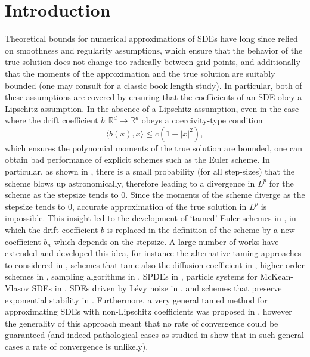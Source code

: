 \documentclass{article}
\begin{document}
\section{Introduction}
Theoretical bounds for numerical approximations of SDEs have long since relied on smoothness and regularity assumptions, which ensure that the behavior of the true solution does not change too radically between grid-points, and additionally that the moments of the approximation and the true solution are suitably bounded (one may consult \cite{kloeden2013numerical} for a classic book length study). In particular, both of these assumptions are covered by ensuring that the coefficients of an SDE obey a Lipschitz assumption. In the absence of a Lipschitz assumption, even in the case where the drift coefficient $b:\mathbb{R}^d\to\mathbb{R}^d$ obeys a coercivity-type condition 
\begin{equation}\label{eq: coercivity}
    \langle b(x),x\rangle\leq c(1+\lvert x\rvert^2),
\end{equation}
which ensures the polynomial moments of the true solution are bounded, one can obtain bad performance of explicit schemes such as the Euler scheme. In particular, as shown in \cite{articlediv, ae1c5b69-79b7-3bf4-87cb-ba6dd72c5ca2}, there is a small probability (for all step-sizes) that the scheme blows up astronomically, therefore leading to a divergence in $L^p$ for the scheme as the stepsize tends to $0$. Since the moments of the scheme diverge as the stepsize tends to $0$, accurate approximation of the true solution in $L^p$ is impossible. This insight led to the development of `tamed' Euler schemes in \cite{da2b46b6-84fa-3eed-be6d-20c143c60df1}, in which the drift coefficient $b$ is replaced in the definition of the scheme by a new coefficient $b_n$ which depends on the stepsize. A large number of works have extended and developed this idea, for instance the alternative taming approaches to \cite{da2b46b6-84fa-3eed-be6d-20c143c60df1} considered in \cite{articletamed, MAO2015370}, schemes that tame also the diffusion coefficient in \cite{articledif}, higher order schemes in \cite{SABANIS201984}, sampling algorithms in \cite{BROSSE20193638, 10.1093/imanum/drad038}, SPDEs in \cite{0329d33d261740b59da99f06a80a9570, Brehier2022}, particle systems for McKean-Vlasov SDEs in \cite{10.1214/21-AAP1760}, SDEs driven by Lévy noise in \cite{doi:10.1137/151004872}, and schemes that preserve exponential stability in \cite{09794cb6-f51d-34af-8144-efe133f5a106}. Furthermore, a very general tamed method for approximating SDEs with non-Lipschitz coefficients was proposed in \cite{arnulf2012}, however the generality of this approach meant that no rate of convergence could be guaranteed (and indeed pathological cases as studied in \cite{doi:10.1080/07362994.2016.1263157, Hairer2012LossOR} show that in such general cases a rate of convergence is unlikely).
\end{document}
